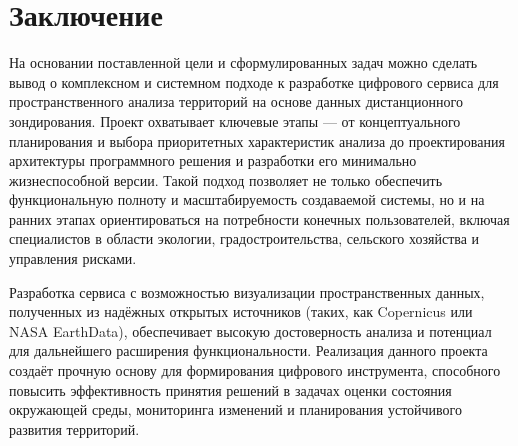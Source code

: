 \chapter{Заключение}
На основании поставленной цели и сформулированных задач можно сделать вывод о комплексном и системном подходе к разработке цифрового сервиса для пространственного анализа территорий на основе данных дистанционного зондирования. Проект охватывает ключевые этапы — от концептуального планирования и выбора приоритетных характеристик анализа до проектирования архитектуры программного решения и разработки его минимально жизнеспособной версии. Такой подход позволяет не только обеспечить функциональную полноту и масштабируемость создаваемой системы, но и на ранних этапах ориентироваться на потребности конечных пользователей, включая специалистов в области экологии, градостроительства, сельского хозяйства и управления рисками.

Разработка сервиса с возможностью визуализации пространственных данных, полученных из надёжных открытых источников (таких, как Copernicus или NASA EarthData), обеспечивает высокую достоверность анализа и потенциал для дальнейшего расширения функциональности. Реализация данного проекта создаёт прочную основу для формирования цифрового инструмента, способного повысить эффективность принятия решений в задачах оценки состояния окружающей среды, мониторинга изменений и планирования устойчивого развития территорий.
